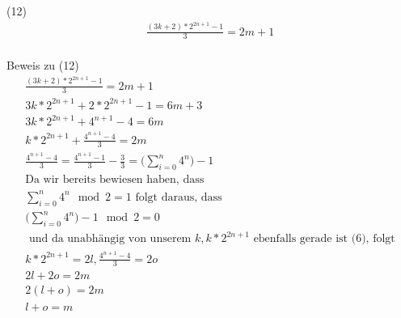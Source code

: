 \documentclass{article}
\begin{document}
(12)
\begin{gather*}
\frac{(3k+2)*2^{2n+1}-1}{3} = 2m + 1
\end{gather*} \\
\newpage
Beweis zu (12)
\begin{gather*}
\frac{(3k+2)*2^{2n+1}-1}{3} = 2m + 1 \\
3k*2^{2n+1}+2*2^{2n+1}-1 = 6m + 3 \\
3k*2^{2n+1}+4^{n+1}-4 = 6m \\
k*2^{2n+1} + \frac{4^{n+1}-4}{3} = 2m \\
\frac{4^{n+1}-4}{3} = \frac{4^{n+1}-1}{3} - \frac{3}{3} = \Big(\sum_{i=0}^{n} 4^n \Big) -1 \\
\text {Da wir bereits bewiesen haben, dass } \\
\sum_{i=0}^{n} 4^n \mod 2 = 1 \text{ folgt daraus, dass } \\
\Big(\sum_{i=0}^{n} 4^n \Big) -1 \mod 2 = 0 \\
\text { und da unabhängig von unserem } k, k*2^{2n+1} \text{ ebenfalls gerade ist (6), folgt} \\
k*2^{2n+1} = 2l, \frac{4^{n+1}-4}{3} = 2o \\
2l + 2o = 2m \\
2(l + o) = 2m \\
l + o = m
\end{gather*}
\end{document}
